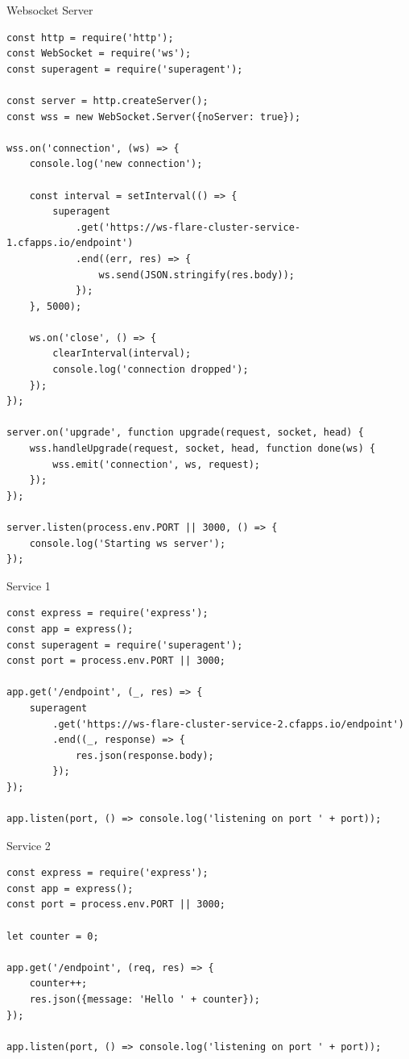 \begin{listing}[H]
    \caption{Websocket Server}
    \label{listing:experiment-2-cluster-websocket-server}
    \begin{verbatim}
const http = require('http');
const WebSocket = require('ws');
const superagent = require('superagent');

const server = http.createServer();
const wss = new WebSocket.Server({noServer: true});

wss.on('connection', (ws) => {
    console.log('new connection');

    const interval = setInterval(() => {
        superagent
            .get('https://ws-flare-cluster-service-1.cfapps.io/endpoint')
            .end((err, res) => {
                ws.send(JSON.stringify(res.body));
            });
    }, 5000);

    ws.on('close', () => {
        clearInterval(interval);
        console.log('connection dropped');
    });
});

server.on('upgrade', function upgrade(request, socket, head) {
    wss.handleUpgrade(request, socket, head, function done(ws) {
        wss.emit('connection', ws, request);
    });
});

server.listen(process.env.PORT || 3000, () => {
    console.log('Starting ws server');
});

\end{verbatim}
\end{listing}

\begin{listing}[H]
    \caption{Service 1}
    \label{listing:experiment-2-service-1}
    \begin{verbatim}
const express = require('express');
const app = express();
const superagent = require('superagent');
const port = process.env.PORT || 3000;

app.get('/endpoint', (_, res) => {
    superagent
        .get('https://ws-flare-cluster-service-2.cfapps.io/endpoint')
        .end((_, response) => {
            res.json(response.body);
        });
});

app.listen(port, () => console.log('listening on port ' + port));
\end{verbatim}
\end{listing}

\begin{listing}[H]
    \caption{Service 2}
    \label{listing:experiment-2-service-2}
    \begin{verbatim}
const express = require('express');
const app = express();
const port = process.env.PORT || 3000;

let counter = 0;

app.get('/endpoint', (req, res) => {
    counter++;
    res.json({message: 'Hello ' + counter});
});

app.listen(port, () => console.log('listening on port ' + port));
\end{verbatim}
\end{listing}

